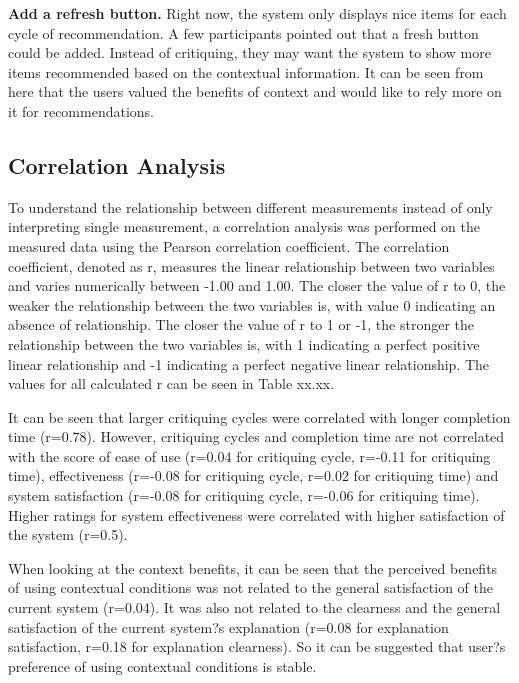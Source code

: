 \textbf{Add a refresh button.} Right now, the system only displays nice items for each cycle of recommendation. A few participants pointed out that a fresh button could be added. Instead of critiquing, they may want the system to show more items recommended based on the contextual information. It can be seen from here that the users valued the benefits of context and would like to rely more on it for recommendations.

\subsection{Correlation Analysis} \label{sec:results_ca}

To understand the relationship between different measurements instead of only interpreting single measurement, a correlation analysis was performed on the measured data using the Pearson correlation coefficient. The correlation coefficient, denoted as r, measures the linear relationship between two variables and varies numerically between -1.00 and 1.00. The closer the value of r to 0, the weaker the relationship between the two variables is, with value 0 indicating an absence of relationship. The closer the value of r to 1 or -1, the stronger the relationship between the two variables is, with 1 indicating a perfect positive linear relationship and -1 indicating a perfect negative linear relationship. The values for all calculated r can be seen in Table xx.xx.

It can be seen that larger critiquing cycles were correlated with longer completion time (r=0.78). However, critiquing cycles and completion time are not correlated with the score of ease of use (r=0.04 for critiquing cycle, r=-0.11 for critiquing time), effectiveness (r=-0.08 for critiquing cycle, r=0.02 for critiquing time) and system satisfaction (r=-0.08 for critiquing cycle, r=-0.06 for critiquing time). Higher ratings for system effectiveness were correlated with higher satisfaction of the system (r=0.5). 

When looking at the context benefits, it can be seen that the perceived benefits of using contextual conditions was not related to the general satisfaction of the current system (r=0.04). It was also not related to the clearness and the general satisfaction of the current system?s explanation (r=0.08 for explanation satisfaction, r=0.18 for explanation clearness). So it can be suggested that user?s preference of using contextual conditions is stable.

